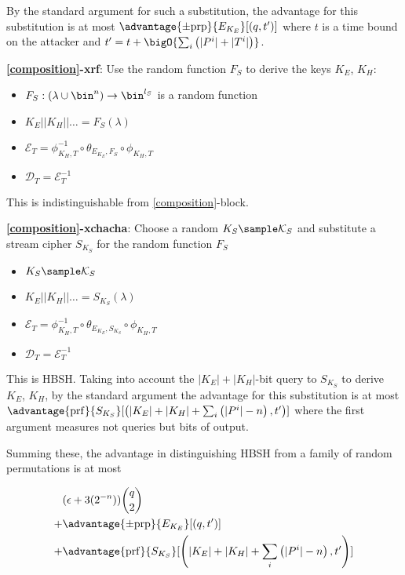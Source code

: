 \documentclass[journal=tosc,preprint,floatrow,submission]{iacrtrans}
\newcommand*{\xprm}[2]{\textsf{\ref*{#1}-#2}}
\newcommand*{\xprmtitle}[2]{\textbf{\xprm{#1}{#2}}}
\newcommand*{\calE}{\mathcal{E}}
\newcommand*{\calD}{\mathcal{D}}
\begin{document}
By the standard argument
for such a substitution, the advantage for this substitution is at most
$\advantage{\pm \mathrm{prp}}{E_{K_E}}[(q, t')]$ where $t$ is a time bound on the attacker and
$t' = t + \bigO{\sum_i \left( |P^i| + |T^i| \right)}$.

\xprmtitle{composition}{xrf}: Use the random function $F_S$ to derive the keys
$K_E$, $K_H$:

\begin{itemize}
    \item $F_S: (\lambda \cup \bin^n) \rightarrow \bin^{l_S}$ is a random function
    \item $K_E || K_H || \ldots = F_S(\lambda)$
    \item $\calE_T = \phi^{-1}_{K_H, T} \circ \theta_{E_{K_E}, F_S} \circ \phi_{K_H, T}$
    \item $\calD_T = \calE_T^{-1}$
\end{itemize}

This is indistinguishable from \xprm{composition}{block}.

\xprmtitle{composition}{xchacha}: Choose a random $K_S \sample \mathcal{K}_S$ and
substitute a stream cipher $S_{K_S}$ for the random function $F_S$

\begin{itemize}
    \item $K_S \sample \mathcal{K}_S$
    \item $K_E || K_H || \ldots = S_{K_S}(\lambda)$
    \item $\calE_T = \phi^{-1}_{K_H, T} \circ \theta_{E_{K_E}, S_{K_S}} \circ \phi_{K_H, T}$
    \item $\calD_T = \calE_T^{-1}$
\end{itemize}

This is HBSH. Taking into account the $|K_E| + |K_H|$-bit
query to $S_{K_S}$ to derive $K_E$, $K_H$,
by the standard argument the advantage for this substitution is at most
$\advantage{\mathrm{prf}}{S_{K_S}}[\left(|K_E| + |K_H| + \sum_i \left(|P^i|-n\right), t'\right)]$
where the first argument measures not queries but bits of output.

Summing these,
the advantage in distinguishing HBSH from a family of random permutations is at most
\label{hbshadvantage}

\begin{align*}
& (\epsilon + 3(2^{-n}))\binom{q}{2} \\
+& \advantage{\pm \mathrm{prp}}{E_{K_E}}[(q, t')] \\
+& \advantage{\mathrm{prf}}{S_{K_S}}[\left(|K_E| + |K_H| + \sum_i \left(|P^i|-n\right), t'\right)]
\end{align*}
\end{document}
